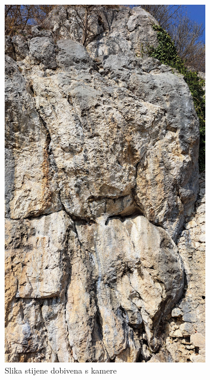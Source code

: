 \begin{figure}[H]
    \centering
    \begin{subfigure}[b]{0.32\textwidth}
        \centering
        \includegraphics[width=\textwidth]{images/racunalniVid/apaches_frame.jpg}
        \caption{Slika stijene dobivena s kamere}
        \label{fig:referentna_slika_stijene}
    \end{subfigure}
    \hfill
    \begin{subfigure}[b]{0.32\textwidth}

\end{subfigure}
\end{figure}
